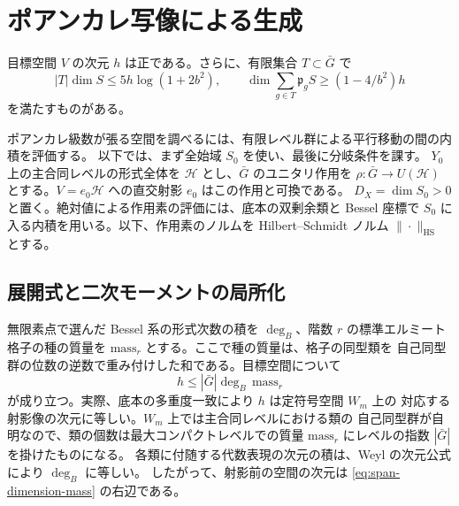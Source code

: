 \section{ポアンカレ写像による生成}\label{sec:spanning}

\begin{theorem}[生成定理 B]\label{thm:spanning}
目標空間 \(V\) の次元 \(h\) は正である。さらに、有限集合 \(T\subset\bar G\) で
\[
  |T|\dim S\leq 5h\log(1+2b^2),\qquad
  \dim\sum_{g\in T}\mathfrak p_g S\geq (1-4/b^2)h
\]
を満たすものがある。
\end{theorem}

ポアンカレ級数が張る空間を調べるには、有限レベル群による平行移動の間の内積を評価する。
以下では、まず全始域 \(S_0\) を使い、最後に分岐条件を課す。
\(Y_0\) 上の主合同レベルの形式全体を \(\mathcal H\) とし、\(\bar G\) のユニタリ作用を
\(\rho\colon\bar G\to U(\mathcal H)\) とする。\(V=e_0\mathcal H\) への直交射影
\(e_0\) はこの作用と可換である。
\(D_X=\dim S_0>0\) と置く。絶対値による作用素の評価には、底本の双剰余類と
Bessel 座標で \(S_0\) に入る内積を用いる。以下、作用素のノルムを Hilbert--Schmidt
ノルム \(\|\cdot\|_{\mathrm{HS}}\) とする。

\subsection{展開式と二次モーメントの局所化}

無限素点で選んだ Bessel 系の形式次数の積を \(\deg_B\)、階数 \(r\) の標準エルミート
格子の種の質量を \(\mathrm{mass}_r\) とする。ここで種の質量は、格子の同型類を
自己同型群の位数の逆数で重み付けした和である。目標空間について
\begin{equation}\label{eq:span-dimension-mass}
 h\leq |\bar G|\deg_B\,\mathrm{mass}_r
\end{equation}
が成り立つ。実際、底本の多重度一致により \(h\) は定符号空間 \(W_m\) 上の
対応する射影像の次元に等しい。\(W_m\) 上では主合同レベルにおける類の
自己同型群が自明なので、類の個数は最大コンパクトレベルでの質量
\(\mathrm{mass}_r\) にレベルの指数 \(|\bar G|\) を掛けたものになる。
各類に付随する代数表現の次元の積は、Weyl の次元公式により \(\deg_B\) に等しい。
したがって、射影前の空間の次元は \eqref{eq:span-dimension-mass} の右辺である。

